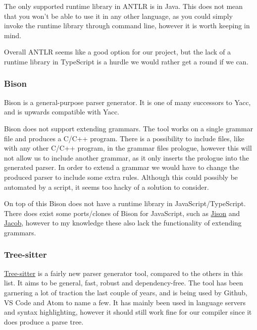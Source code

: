 The only supported runtime library in ANTLR is in Java.
This does not mean that you won't be able to use it in any other language, as you could simply invoke the runtime library through command line, however it is worth keeping in mind.

Overall ANTLR seems like a good option for our project, but the lack of a runtime library in TypeScript is a hurdle we would rather get a round if we can.

\subsubsection{Bison}\label{subsubsec:bison}

Bison is a general-purpose parser generator.
It is one of many successors to Yacc, and is upwards compatible with Yacc\cite{bison}.

Bison does not support extending grammars.
The tool works on a single grammar file and produces a C/C++ program.
There is a possibility to include files, like with any other C/C++ program, in the grammar files prologue, however this will not allow us to include another grammar, as it only inserts the prologue into the generated parser.
In order to extend a grammar we would have to change the produced parser to include some extra rules.
Although this could possibly be automated by a script, it seems too hacky of a solution to consider.

On top of this Bison does not have a runtime library in JavaScript/TypeScript.
There does exist some ports/clones of Bison for JavaScript, such as \href{http://zaa.ch/jison/}{Jison} and \href{http://canna71.github.io/Jacob/}{Jacob}, however to my knowledge these also lack the functionality of extending grammars.

\subsubsection{Tree-sitter}\label{subsubsec:tree-sitter}

\href{https://tree-sitter.github.io/tree-sitter/}{Tree-sitter} is a fairly new parser generator tool, compared to the others in this list.
It aims to be general, fast, robust and dependency-free\cite{tree-sitter}.
The tool has been garnering a lot of traction the last couple of years, and is being used by Github, VS Code and Atom to name a few.
It has mainly been used in language servers and syntax highlighting, however it should still work fine for our compiler since it does produce a parse tree.

